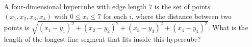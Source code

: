 A four-dimensional hypercube with edge length $7$ is the set of points $(x_1,x_2,x_3,x_4)$ with $0\le x_i\le7$ for each $i$, where the distance between two points is $\sqrt{(x_1-y_1)^2+(x_2-y_2)^2+(x_3-y_3)^2+(x_4-y_4)^2}$. What is the length of the longest line segment that fits inside this hypercube?
